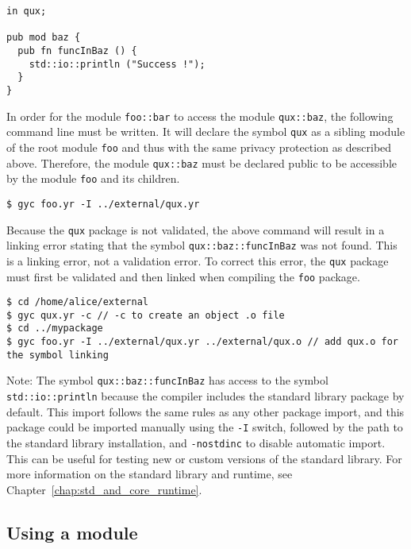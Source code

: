 \begin{lstlisting}[caption=\textit{/home/alice/external/qux.yr}, style=coloredverbatim]
in qux;

pub mod baz {
  pub fn funcInBaz () {
    std::io::println ("Success !");
  }
}
\end{lstlisting}

In order for the module \texttt{foo::bar} to access the module
\texttt{qux::baz}, the following command line must be written. It will declare
the symbol \texttt{qux} as a sibling module of the root module \texttt{foo} and
thus with the same privacy protection as described above. Therefore, the module
\texttt{qux::baz} must be declared public to be accessible by the module
\texttt{foo} and its children.

\begin{lstlisting}[style=intermediateVerb]
$ gyc foo.yr -I ../external/qux.yr
\end{lstlisting}

Because the \texttt{qux} package is not validated, the above command will result
in a linking error stating that the symbol \texttt{qux::baz::funcInBaz} was not
found. This is a linking error, not a validation error. To correct this error,
the \texttt{qux} package must first be validated and then linked when compiling
the \texttt{foo} package.

\begin{minipage}{\linewidth}
\begin{lstlisting}[style=intermediateVerb]
$ cd /home/alice/external
$ gyc qux.yr -c // -c to create an object .o file
$ cd ../mypackage
$ gyc foo.yr -I ../external/qux.yr ../external/qux.o // add qux.o for the symbol linking
\end{lstlisting}
\end{minipage}

Note: The symbol \texttt{qux::baz::funcInBaz} has access to the symbol
\texttt{std::io::println} because the compiler includes the standard library
package by default. This import follows the same rules as any other package
import, and this package could be imported manually using the \texttt{-I}
switch, followed by the path to the standard library installation, and
\texttt{-nostdinc} to disable automatic import. This can be useful for testing
new or custom versions of the standard library. For more information on the
standard library and runtime, see Chapter~\ref{chap:std_and_core_runtime}.

\subsection {Using a module}

